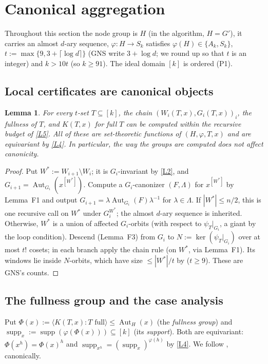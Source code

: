 \documentclass[11pt]{article}
\theoremstyle{plain}
\newtheorem{lemma}[theorem]{Lemma}
\theoremstyle{definition}
\theoremstyle{remark}
\theoremstyle{named}
\theoremstyle{namedrm}
\newcommand{\Aut}{\operatorname{Aut}}
\newcommand{\supp}{\operatorname{supp}}
\newcommand{\win}[2]{#1^{[#2]}}
\begin{document}
\section{Canonical aggregation}\label{sec:agg}

Throughout this section the node group is $H$ (in the algorithm, $H=G'$), it carries an almost $d$-ary
sequence, $\varphi\colon H\to S_k$ satisfies $\varphi(H)\in\{A_k,S_k\}$, $t:=\max\{9,3+\lceil\log d\rceil\}$ (GNS
write $3+\log d$; we round up so that $t$ is an integer) and $k>10t$ (so $k\ge91$). The ideal domain $[k]$
is ordered (P1).

\subsection{Local certificates are canonical objects}

\begin{lemma}\label{lem:51}
For every $t$-set $T\subseteq[k]$, the chain $(W_i(T,x),G_i(T,x))_i$, the fullness of $T$, and $K(T,x)$ for
full $T$ can be computed within the recursive budget of \ref{L5}. All of these are set-theoretic
functions of $(H,\varphi,T,x)$ and are equivariant by \ref{L4}. In particular, the way the groups are
computed does not affect canonicity.
\end{lemma}
\begin{proof}
Put $W^*:=W_{i+1}\setminus W_i$; it is $G_i$-invariant by \ref{L2}, and $G_{i+1}=\Aut_{G_i}(\win{x}{W^*})$.
Compute a $G_i$-canonizer $(F,\Lambda)$ for $\win{x}{W^*}$ by Lemma~F1 and output
$G_{i+1}=\lambda\Aut_{G_i}(F)\lambda^{-1}$ for $\lambda\in\Lambda$. If $|W^*|\le n/2$, this is one recursive call on
$W^*$ under $G_i^{W^*}$; the almost $d$-ary sequence is inherited. Otherwise, $W^*$ is a union of affected
$G_i$-orbits (with respect to $\psi_T|_{G_i}$, a giant by the loop condition). Descend (Lemma~F3) from
$G_i$ to $N:=\ker(\psi_T|_{G_i})$ over at most $t!$ cosets; in each branch apply the chain rule (on $W^*$, via Lemma~F1). Its windows
lie inside $N$-orbits, which have size $\le|W^*|/t$ by \cite[Thm.~5.9]{GNS} ($t\ge9$). These are GNS's
counts.
\end{proof}

\subsection{The fullness group and the case analysis}

Put $\Phi(x):=\langle K(T,x):T\text{ full}\rangle\le\Aut_H(x)$ (the \emph{fullness group}) and
$\supp_x:=\supp(\varphi(\Phi(x)))\subseteq[k]$ (its \emph{support}). Both are equivariant: $\Phi(x^h)=\Phi(x)^h$ and
$\supp_{x^h}=(\supp_x)^{\varphi(h)}$ by \ref{L4}. We follow
\cite[App.~A]{GNS}, canonically.
\end{document}
